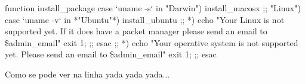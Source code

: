 \begin{code_files}
function install\_package {
        case `uname -s` in
                "Darwin")
                        install\_macosx
                        ;;
                "Linux")
                        case `uname -v` in
                                *"Ubuntu"*)
                                        install\_ubuntu
                                        ;;
                                *)
                                        echo "Your Linux is not supported yet. If it does have a packet manager please send an email to \$admin\_email"
                                        exit 1;
                                        ;;
                                esac
                        ;;
                *)
                        echo "Your operative system is not supported yet. Please send an email to \$admin\_email"
                        exit 1;
                        ;;
        esac
}
\end{code_files}

Como se pode ver na linha yada yada yada...